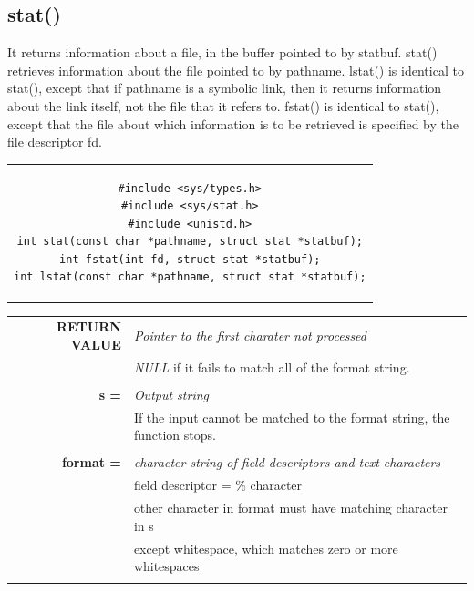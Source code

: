 \subsection{stat()}
It returns information about a file, in the buffer pointed to by statbuf. stat() retrieves information about the file pointed to by pathname. lstat() is identical to stat(), except that if pathname is a symbolic link, then it returns information about the link itself, not the file that it refers to. fstat() is identical to stat(), except that the file about which information is to be retrieved is specified by the file descriptor fd.
\begin{center}
\begin{tabular}{c}
\begin{lstlisting}[linewidth=280pt, basicstyle=\footnotesize\sffamily,]
#include <sys/types.h>
#include <sys/stat.h>
#include <unistd.h>
int stat(const char *pathname, struct stat *statbuf);
int fstat(int fd, struct stat *statbuf);
int lstat(const char *pathname, struct stat *statbuf);
\end{lstlisting}
\end{tabular}
\end{center}

\begin{table}[H]
\centering\footnotesize
\begin{tabular}{rl}
\textbf{RETURN VALUE} & {\textit{Pointer to the first charater not processed}}\\
{} & {\textit{NULL} if it fails to match all of the format string.}\\
& \\
\textbf{s =} & {\textit{Output string}}\\
{}&{If the input cannot be matched to the format string, the function stops.}\\
& \\
\textbf{format =} & {\textit{character string of field descriptors and text characters}}\\
{}&{field descriptor = \% character}\\
{}&{other character in format must have matching character in s}\\
{}&{except whitespace, which matches zero or more whitespaces}\\
& \\
\end{tabular}
\end{table}

